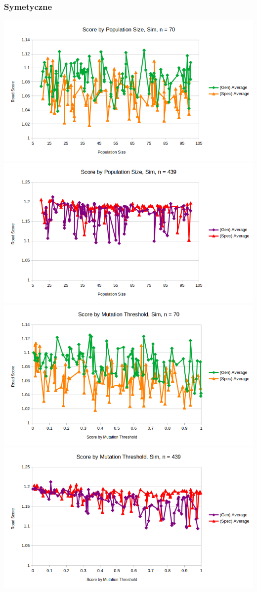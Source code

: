 \documentclass{article}
\begin{document}
\subsubsection*{Symetyczne}
\includegraphics[scale=0.36]{pSSim70}
\includegraphics[scale=0.36]{pSSim439}
\includegraphics[scale=0.36]{mTSim70}
\includegraphics[scale=0.36]{mTSim439}
\end{document}
